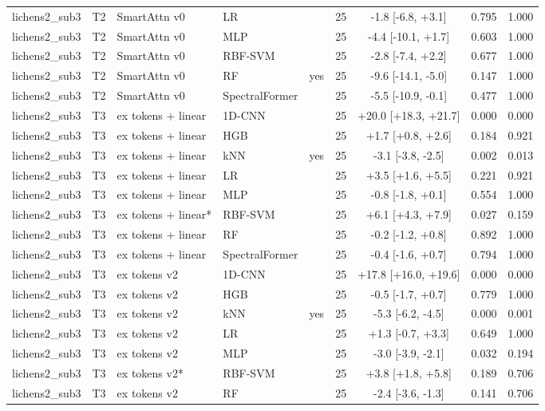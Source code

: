 \begin{tabular}{lllllcccc}
lichens2_sub3 & T2 & SmartAttn v0 & LR &  & 25 & -1.8 [-6.8, +3.1] & 0.795 & 1.000 \\
lichens2_sub3 & T2 & SmartAttn v0 & MLP &  & 25 & -4.4 [-10.1, +1.7] & 0.603 & 1.000 \\
lichens2_sub3 & T2 & SmartAttn v0 & RBF-SVM &  & 25 & -2.8 [-7.4, +2.2] & 0.677 & 1.000 \\
lichens2_sub3 & T2 & SmartAttn v0 & RF & yes & 25 & -9.6 [-14.1, -5.0] & 0.147 & 1.000 \\
lichens2_sub3 & T2 & SmartAttn v0 & SpectralFormer &  & 25 & -5.5 [-10.9, -0.1] & 0.477 & 1.000 \\
lichens2_sub3 & T3 & ex tokens + linear & 1D-CNN &  & 25 & +20.0 [+18.3, +21.7] & 0.000 & 0.000 \\
lichens2_sub3 & T3 & ex tokens + linear & HGB &  & 25 & +1.7 [+0.8, +2.6] & 0.184 & 0.921 \\
lichens2_sub3 & T3 & ex tokens + linear & kNN & yes & 25 & -3.1 [-3.8, -2.5] & 0.002 & 0.013 \\
lichens2_sub3 & T3 & ex tokens + linear & LR &  & 25 & +3.5 [+1.6, +5.5] & 0.221 & 0.921 \\
lichens2_sub3 & T3 & ex tokens + linear & MLP &  & 25 & -0.8 [-1.8, +0.1] & 0.554 & 1.000 \\
lichens2_sub3 & T3 & ex tokens + linear* & RBF-SVM &  & 25 & +6.1 [+4.3, +7.9] & 0.027 & 0.159 \\
lichens2_sub3 & T3 & ex tokens + linear & RF &  & 25 & -0.2 [-1.2, +0.8] & 0.892 & 1.000 \\
lichens2_sub3 & T3 & ex tokens + linear & SpectralFormer &  & 25 & -0.4 [-1.6, +0.7] & 0.794 & 1.000 \\
lichens2_sub3 & T3 & ex tokens v2 & 1D-CNN &  & 25 & +17.8 [+16.0, +19.6] & 0.000 & 0.000 \\
lichens2_sub3 & T3 & ex tokens v2 & HGB &  & 25 & -0.5 [-1.7, +0.7] & 0.779 & 1.000 \\
lichens2_sub3 & T3 & ex tokens v2 & kNN & yes & 25 & -5.3 [-6.2, -4.5] & 0.000 & 0.001 \\
lichens2_sub3 & T3 & ex tokens v2 & LR &  & 25 & +1.3 [-0.7, +3.3] & 0.649 & 1.000 \\
lichens2_sub3 & T3 & ex tokens v2 & MLP &  & 25 & -3.0 [-3.9, -2.1] & 0.032 & 0.194 \\
lichens2_sub3 & T3 & ex tokens v2* & RBF-SVM &  & 25 & +3.8 [+1.8, +5.8] & 0.189 & 0.706 \\
lichens2_sub3 & T3 & ex tokens v2 & RF &  & 25 & -2.4 [-3.6, -1.3] & 0.141 & 0.706 \\

\end{tabular}
